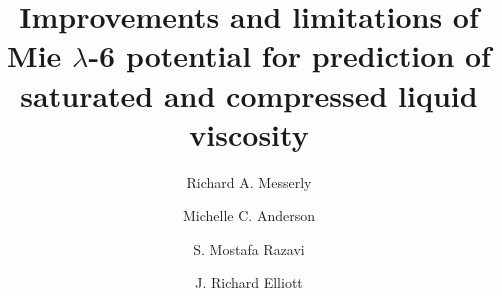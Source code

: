 \documentclass[preprint,review,12pt]{elsarticle}
\begin{document}
	
	\begin{frontmatter}
		
		
		
		\title{Improvements and limitations of Mie $\lambda$-6 potential for prediction of saturated and compressed liquid viscosity}
		
		
		\author{Richard A. Messerly}
		\address{Thermodynamics Research Center, National Institute of Standards and Technology, Boulder, Colorado, 80305}
		
		\author{Michelle C. Anderson}
		\address{Thermodynamics Research Center, National Institute of Standards and Technology, Boulder, Colorado, 80305}
		
		\author{S. Mostafa Razavi}
		\address{Department of Chemical and Biomolecular Engineering, The University of Akron, Akron, Ohio, 44325-3906}
		
		\author{J. Richard Elliott}
		\address{Department of Chemical and Biomolecular Engineering, The University of Akron, Akron, Ohio, 44325-3906}
		

\end{frontmatter}
\end{document}
